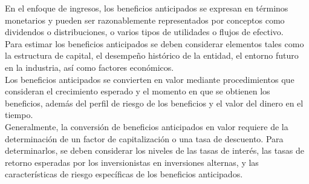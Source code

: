 En el enfoque de ingresos, los beneficios anticipados se expresan en t\'erminos monetarios y pueden ser razonablemente representados por conceptos como dividendos o distribuciones, o varios tipos de utilidades o flujos de efectivo. \\[10pt]

Para estimar los beneficios anticipados se deben considerar elementos tales como la estructura de capital, el desempe\~no hist\'orico de la entidad, el entorno futuro en la industria, as\'i como factores econ\'omicos.\\[10pt]

Los beneficios anticipados se convierten en valor mediante procedimientos que consideran el crecimiento esperado y el momento en que se obtienen los beneficios, adem\'as del perfil de riesgo de los beneficios y el valor del dinero en el tiempo.\\[10pt]

Generalmente, la conversi\'on de beneficios anticipados en valor requiere de la determinaci\'on de un factor de capitalizaci\'on o una tasa de descuento. Para determinarlos, se deben considerar los niveles de las tasas de inter\'es, las tasas de retorno esperadas por los inversionistas en inversiones alternas, y las caracter\'isticas de riesgo espec\'ificas de los beneficios anticipados.\\